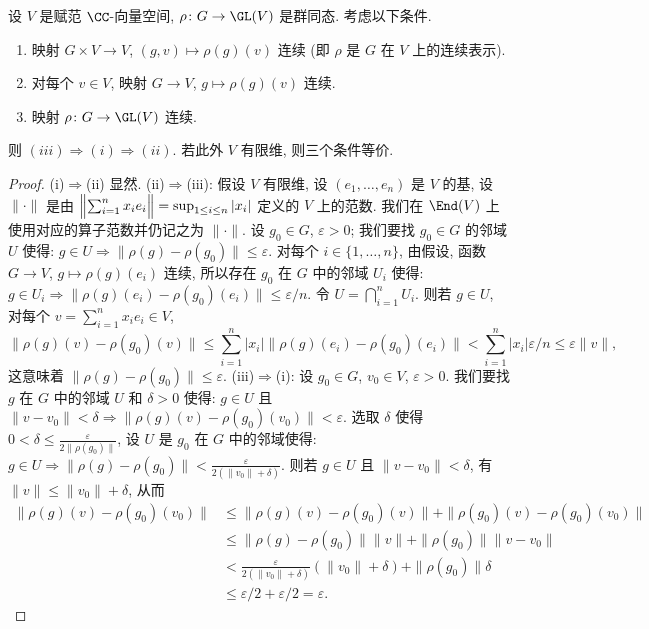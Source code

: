 \begin{proposition}[有限维表示的条件]
\label{prop:I.3.5.1}
设 $V$ 是赋范 $\CC$-向量空间, $\rho \colon G \to \GL(V)$ 是群同态. 考虑以下条件.
\begin{enumerate}
\item[(i)] 映射 $G \times V \to V$, $(g, v) \longmapsto \rho(g)(v)$ 连续 (即 $\rho$ 是 $G$ 在 $V$ 上的连续表示).
\item[(ii)] 对每个 $v \in V$, 映射 $G \to V$, $g \longmapsto \rho(g)(v)$ 连续.
\item[(iii)] 映射 $\rho \colon G \to \GL(V)$ 连续.
\end{enumerate}
则 $(iii) \Rightarrow (i) \Rightarrow (ii)$. 若此外 $V$ 有限维, 则三个条件等价.
\end{proposition}

\begin{proof}
(i)$\Rightarrow$(ii) 显然.
(ii)$\Rightarrow$(iii): 假设 $V$ 有限维, 设 $(e_1, \ldots, e_n)$ 是 $V$ 的基, 设 $\|\cdot\|$ 是由 $\Bigl\|\sum_{i=1}^n x_ie_i\Bigr\| = \sup_{1 \leq i \leq n}|x_i|$ 定义的 $V$ 上的范数. 我们在 $\End(V)$ 上使用对应的算子范数并仍记之为 $\|\cdot\|$. 设 $g_0 \in G$, $\varepsilon > 0$; 我们要找 $g_0 \in G$ 的邻域 $U$ 使得: $g \in U \Rightarrow \|\rho(g) - \rho(g_0)\| \leq \varepsilon$.
对每个 $i \in \{1, \ldots, n\}$, 由假设, 函数 $G \to V$, $g \longmapsto \rho(g)(e_i)$ 连续, 所以存在 $g_0$ 在 $G$ 中的邻域 $U_i$ 使得: $g \in U_i \Rightarrow \|\rho(g)(e_i) - \rho(g_0)(e_i)\| \leq \varepsilon/n$. 令 $U = \bigcap_{i=1}^n U_i$. 则若 $g \in U$, 对每个 $v = \sum_{i=1}^n x_ie_i \in V$,
\[
\|\rho(g)(v) - \rho(g_0)(v)\| \leq \sum_{i=1}^n |x_i|\|\rho(g)(e_i) - \rho(g_0)(e_i)\| < \sum_{i=1}^n |x_i|\varepsilon/n \leq \varepsilon\|v\|,
\]
这意味着 $\|\rho(g) - \rho(g_0)\| \leq \varepsilon$.
(iii)$\Rightarrow$(i): 设 $g_0 \in G$, $v_0 \in V$, $\varepsilon > 0$. 我们要找 $g$ 在 $G$ 中的邻域 $U$ 和 $\delta > 0$ 使得: $g \in U$ 且 $\|v - v_0\| < \delta \Rightarrow \|\rho(g)(v) - \rho(g_0)(v_0)\| < \varepsilon$.
选取 $\delta$ 使得 $0 < \delta \leq \frac{\varepsilon}{2\|\rho(g_0)\|}$, 设 $U$ 是 $g_0$ 在 $G$ 中的邻域使得: $g \in U \Rightarrow \|\rho(g) - \rho(g_0)\| < \frac{\varepsilon}{2(\|v_0\| + \delta)}$. 则若 $g \in U$ 且 $\|v - v_0\| < \delta$, 有 $\|v\| \leq \|v_0\| + \delta$, 从而
\begin{align*}
\|\rho(g)(v) - \rho(g_0)(v_0)\| &\leq \|\rho(g)(v) - \rho(g_0)(v)\| + \|\rho(g_0)(v) - \rho(g_0)(v_0)\| \\
&\leq \|\rho(g) - \rho(g_0)\|\|v\| + \|\rho(g_0)\|\|v - v_0\| \\
&< \frac{\varepsilon}{2(\|v_0\| + \delta)}(\|v_0\| + \delta) + \|\rho(g_0)\|\delta \\
&\leq \varepsilon/2 + \varepsilon/2 = \varepsilon.
\end{align*}
\end{proof}

